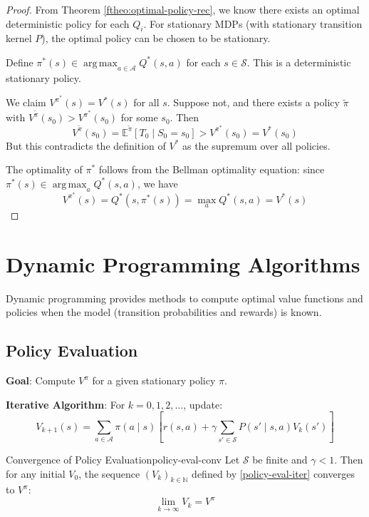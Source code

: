 \documentclass[a4paper, 11pt]{article}
\numberwithin{equation}{section}
\theoremstyle{plain}
\theoremstyle{definition}
\newcommand{\E}{{\mathbb E}}
\newcommand{\1}{{\mathbbm 1}}
\newcommand{\mc}[1]{\mathcal{#1}}
\DeclareMathOperator*{\argmax}{arg\,max}
\newcommand{\N}{{\mathbb{N}}}
\begin{document}
	\begin{proof}
		From Theorem \ref{ftheo:optimal-policy-rec}, we know there exists an optimal deterministic policy for each $Q_i$. For stationary MDPs (with stationary transition kernel $P$), the optimal policy can be chosen to be stationary.
		
		Define $\pi^*(s) \in \argmax_{a \in \mc{A}} Q^{*}(s, a)$ for each $s \in \mc{S}$. This is a deterministic stationary policy. 
		
		We claim $V^{\pi^*}(s) = V^{*}(s)$ for all $s$. Suppose not, and there exists a policy $\tilde{\pi}$ with $V^{\tilde{\pi}}(s_0) > V^{\pi^*}(s_0)$ for some $s_0$. Then
		\begin{equation*}
			V^{\tilde{\pi}}(s_0) = \E^{\tilde{\pi}}[T_0\;|\; S_0 = s_0] > V^{\pi^*}(s_0) = V^{*}(s_0)
		\end{equation*}
		But this contradicts the definition of $V^{*}$ as the supremum over all policies.
		
		The optimality of $\pi^*$ follows from the Bellman optimality equation: since $\pi^*(s) \in \argmax_a Q^{*}(s, a)$, we have
		\begin{equation*}
			V^{\pi^*}(s) = Q^{*}(s, \pi^*(s)) = \max_{a} Q^{*}(s, a) = V^{*}(s)
		\end{equation*}
	\end{proof}
	
	\section{Dynamic Programming Algorithms}
	
	Dynamic programming provides methods to compute optimal value functions and policies when the model (transition probabilities and rewards) is known.
	
	\subsection{Policy Evaluation}
	
	\textbf{Goal}: Compute $V^{\pi}$ for a given stationary policy $\pi$.
	
	\textbf{Iterative Algorithm}: For $k = 0, 1, 2, \ldots$, update:
	\begin{equation}\label{policy-eval-iter}
		V_{k+1}(s) = \sum_{a \in \mc{A}} \pi(a\;|\; s) \left[ r(s, a) + \gamma \sum_{s' \in \mc{S}} P(s'\;|\; s, a) V_k(s') \right]
	\end{equation}
	
	\begin{ftheo}{Convergence of Policy Evaluation}{policy-eval-conv}
		Let $\mc{S}$ be finite and $\gamma < 1$. Then for any initial $V_0$, the sequence $(V_k)_{k \in \N}$ defined by \eqref{policy-eval-iter} converges to $V^{\pi}$:
		\begin{equation}
			\lim_{k \to \infty} V_k = V^{\pi}
		\end{equation}
	\end{ftheo}
	
\end{document}
